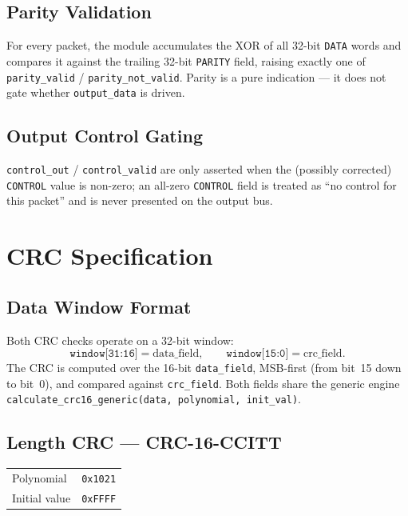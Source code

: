 \documentclass[11pt,a4paper]{article}
\begin{document}
\subsection{Parity Validation}
For every packet, the module accumulates the XOR of all 32-bit \texttt{DATA}
words and compares it against the trailing 32-bit \texttt{PARITY} field,
raising exactly one of \texttt{parity\_valid} / \texttt{parity\_not\_valid}.
Parity is a pure indication --- it does not gate whether \texttt{output\_data}
is driven.

\subsection{Output Control Gating}
\texttt{control\_out} / \texttt{control\_valid} are only asserted when the
(possibly corrected) \texttt{CONTROL} value is non-zero; an all-zero
\texttt{CONTROL} field is treated as ``no control for this packet'' and is
never presented on the output bus.

\section{CRC Specification}

\subsection{Data Window Format}
Both CRC checks operate on a 32-bit window:
\[
  \texttt{window[31:16]} = \text{data\_field}, \qquad
  \texttt{window[15:0]} = \text{crc\_field}.
\]
The CRC is computed over the 16-bit \texttt{data\_field}, MSB-first
(from bit~15 down to bit~0), and compared against \texttt{crc\_field}.
Both fields share the generic engine
\texttt{calculate\_crc16\_generic(data, polynomial, init\_val)}.

\subsection{Length CRC --- CRC-16-CCITT}
\begin{center}
\begin{tabular}{ll}
\toprule
Polynomial & \texttt{0x1021} \\
Initial value & \texttt{0xFFFF} \\
\bottomrule
\end{tabular}
\end{center}
\end{document}
